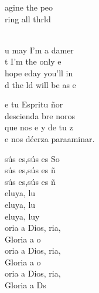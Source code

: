 \documentclass[12pt]{article}
\begin{document}
\begin{multicols*}{2}
\begin{cancion}
	\begin{chorus}%
	agine  the peo\\
	ring all thrld\\
	\end{chorus}%
	\jump\\
	u may  I'm a damer \\
	t I'm  the only e  \\
	hope eday you'll in \\
	d the ld will be as e\\
\end{cancion}%

\begin{cancion}%
	e tu Espritu ñor\\
	descienda bre noros   \\
	que nos e y de tu z  \\
	e nos déerza paraaminar.\\
\end{cancion}%

\begin{cancion}%
	sús es,sús es So\\
	sús es,sús es ñ \\
	sús es,sús es ñ\\
	eluya, lu  \\
	eluya, lu  \\
	eluya, luy  \\
	oria a Dios, ria, \\
	Gloria a o\\
	oria a Dios, ria, \\
	Gloria a o \\
	oria a Dios, ria, \\
	Gloria a Ds\\
\end{cancion}%


\end{multicols*}
\end{document}

